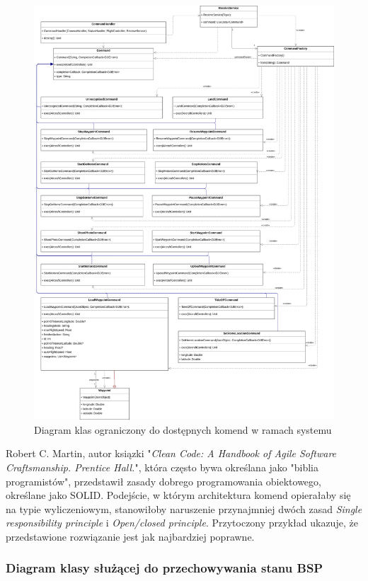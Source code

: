 \begin{figure}[!htbp]
  \centering
  \includegraphics[width=16cm]{./Obrazy/commands.png}
  \caption{Diagram klas ograniczony do dostępnych komend w ramach systemu}
  \end{figure}

Robert C. Martin, autor ksiązki "\textit{Clean Code: A Handbook of Agile Software Craftsmanship. Prentice Hall.}", która często bywa określana jako "biblia programistów", przedstawił zasady dobrego programowania obiektowego, określane jako SOLID. Podejście, w którym architektura komend opierałaby się na typie wyliczeniowym, stanowiłoby naruszenie przynajmniej dwóch zasad \textit{Single responsibility principle} i \textit{Open/closed principle}. Przytoczony przykład ukazuje, że przedstawione rozwiązanie jest jak najbardziej poprawne.\cite{solid}\cite{clean-code}


\subsubsection{Diagram klasy służącej do przechowywania stanu BSP}


